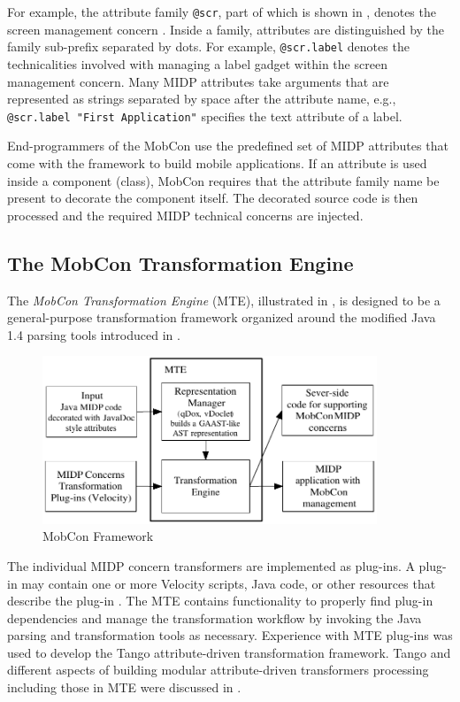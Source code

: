 For example, the attribute family \texttt{@scr}, part of which is shown in , denotes the screen management concern . Inside a family, attributes are distinguished by the family sub-prefix separated by dots. For example, \texttt{@scr.label} denotes the technicalities involved with managing a label gadget within the screen management concern. Many MIDP attributes take arguments that are represented as strings separated by space after the attribute name, e.g., \texttt{@scr.label "First Application"} specifies the text attribute of a label.

End-programmers of the MobCon use the predefined set of MIDP attributes that come with the framework to build mobile applications.  If an attribute is used inside a component (class), MobCon requires that the attribute family name be present to decorate the component itself. The decorated source code is then processed and the required MIDP technical concerns are injected.

\subsection{The MobCon Transformation Engine}
\label{sec.mc.mte}

The \textit{MobCon Transformation Engine} (MTE), illustrated in , is designed to be a general-purpose transformation framework organized around the modified Java 1.4 parsing tools introduced in .

\begin{figure}[ht]
	\begin{center}
		\includegraphics[width=10cm,height=!]{ch05/mte}
	\end{center}
	\caption{MobCon Framework}
	\label{fig:mc-mte}
\end{figure}

The individual MIDP concern transformers are implemented as plug-ins. A plug-in may contain one or more Velocity scripts, Java code, or other resources that describe the plug-in . The MTE contains functionality to properly find plug-in dependencies and manage the transformation workflow  by invoking the Java parsing and transformation tools as necessary. Experience with MTE plug-ins was used to develop the Tango attribute-driven transformation framework. Tango and different aspects of building modular attribute-driven transformers processing including those in MTE were discussed in .

